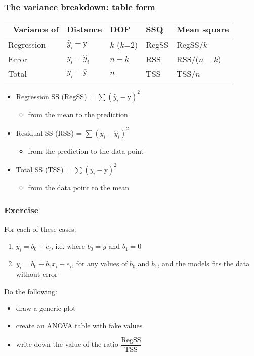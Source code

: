 \begin{frame}\frametitle{The variance breakdown: table form}

	\newpage
	\begin{table}
		[ht] \centering
		\begin{tabular}
			{lllll} \hline\ \textbf{Variance of} & \textbf{Distance} &\textbf{DOF} &\textbf{SSQ} &\textbf{Mean square} \\
			\hline Regression & $\hat{y}_i - \overline{\mathrm{y}}$ & $k$ ($k$=2) & RegSS & RegSS/$k$ \\
			Error & $y_i - \hat{y}_i$ & $n-k$ & RSS & RSS/($n-k$) \\
			\hline \hline Total & $y_i - \overline{\mathrm{y}}$ & $n$ & TSS & TSS/$n$ \\
			\hline
		\end{tabular}
	\end{table}
	\begin{itemize}
		\item	Regression SS (RegSS) = $\sum{(\hat{y}_i - \overline{\mathrm{y}})^2}$ 
			\begin{itemize}
				\item	from the mean to the prediction
			\end{itemize}
			
		\vspace{12pt}
		\item	Residual SS (RSS) = $\sum{(y_i - \hat{y}_i)^2}$
		\begin{itemize}
			\item	from the prediction to the data point
		\end{itemize} 
		
		\vspace{12pt}
		\item	Total SS (TSS) = $\sum{(y_i - \overline{\mathrm{y}})^2}$ 
		\begin{itemize}
			\item	from the data point to the mean
		\end{itemize}
	\end{itemize}
\end{frame}

\begin{frame}\frametitle{Exercise}

	For each of these cases:
	\begin{enumerate}
		\item	$y_i = b_0 + e_i$, i.e. where $b_0 = \overline{y}$ and $b_1 = 0$
		\item	$y_i = b_0 + b_1 x_i + e_i$, for any values of $b_0$ and $b_1$, and the models fits the data without error
	\end{enumerate}

	\vspace{12pt}
	Do the following:
	\begin{itemize}
		\item	draw a generic plot
		\item	create an ANOVA table with fake values
		\item	write down the value of the ratio $\dfrac{\text{RegSS}}{\text{TSS}}$
	\end{itemize}
\end{frame}

